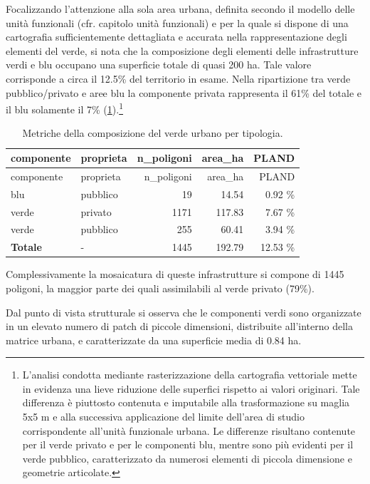 \documentclass[
  a4paper,
]{book}
\begin{document}
Focalizzando l'attenzione alla sola area urbana, definita secondo il modello delle unità funzionali (cfr. capitolo unità funzionali) e per la quale si dispone di una cartografia sufficientemente dettagliata e accurata nella rappresentazione degli elementi del verde, si nota che la composizione degli elementi delle infrastrutture verdi e blu occupano una superficie totale di quasi 200 ha.
Tale valore corrisponde a circa il 12.5\% del territorio in esame.
Nella ripartizione tra verde pubblico/privato e aree blu la componente privata rappresenta il 61\% del totale e il blu solamente il 7\% (\ref{tab:verdeBase}).\footnote{L'analisi condotta mediante rasterizzazione della cartografia vettoriale mette in evidenza una lieve riduzione delle superfici rispetto ai valori originari. Tale differenza è piuttosto contenuta e imputabile alla trasformazione su maglia 5x5 m e alla successiva applicazione del limite dell'area di studio corrispondente all'unità funzionale urbana. Le differenze risultano contenute per il verde privato e per le componenti blu, mentre sono più evidenti per il verde pubblico, caratterizzato da numerosi elementi di piccola dimensione e geometrie articolate.}

\begin{longtable}[]{@{}llrrr@{}}
\caption{\label{tab:verdeBase} Metriche della composizione del verde urbano per tipologia.}\tabularnewline
\toprule\noalign{}
componente & proprieta & n\_poligoni & area\_ha & PLAND \\
\midrule\noalign{}
\endfirsthead
\toprule\noalign{}
componente & proprieta & n\_poligoni & area\_ha & PLAND \\
\midrule\noalign{}
\endhead
\bottomrule\noalign{}
\endlastfoot
blu & pubblico & 19 & 14.54 & 0.92 \% \\
verde & privato & 1171 & 117.83 & 7.67 \% \\
verde & pubblico & 255 & 60.41 & 3.94 \% \\
\textbf{Totale} & - & 1445 & 192.79 & 12.53 \% \\
\end{longtable}

Complessivamente la mosaicatura di queste infrastrutture si compone di 1445 poligoni, la maggior parte dei quali assimilabili al verde privato (79\%).

Dal punto di vista strutturale si osserva che le componenti verdi sono organizzate in un elevato numero di patch di piccole dimensioni, distribuite all'interno della matrice urbana, e caratterizzate da una superficie media di 0.84 ha.
\end{document}
